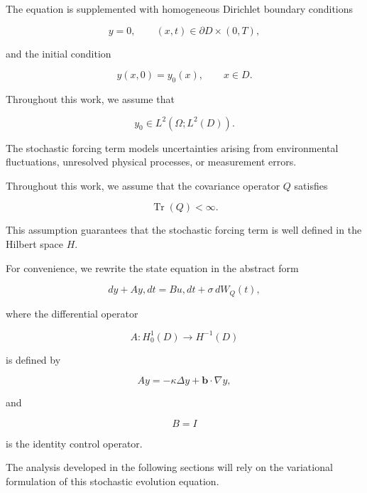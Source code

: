 The equation is supplemented with homogeneous Dirichlet boundary conditions

\[
y=0,
\qquad
(x,t)\in \partial D\times(0,T),
\]

and the initial condition

\[
y(x,0)=y_0(x),
\qquad
x\in D.
\]

Throughout this work, we assume that

\[
y_0\in L^2(\Omega;L^2(D)).
\]

The stochastic forcing term models uncertainties arising from environmental fluctuations, unresolved physical 
processes, or measurement errors.

Throughout this work, we assume that the covariance operator \(Q\) satisfies

\[
\operatorname{Tr}(Q)<\infty.
\]

This assumption guarantees that the stochastic forcing term is well defined in the Hilbert space \(H\).

For convenience, we rewrite the state equation in the abstract form

\[
dy + Ay,dt = Bu,dt + \sigma\,dW_Q(t),
\]

where the differential operator

\[
A:H_0^1(D)\rightarrow H^{-1}(D)
\]

is defined by

\[
Ay
=
-\kappa \Delta y
+
\mathbf{b}\cdot\nabla y,
\]

and

\[
B=I
\]

is the identity control operator.

The analysis developed in the following sections will rely on the variational formulation of this 
stochastic evolution equation.
